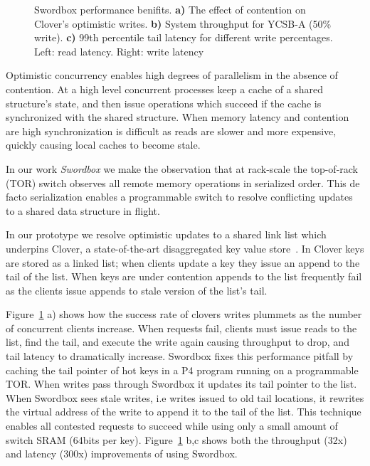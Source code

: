 \begin{figure}[t!]
    \caption{Swordbox performance benifits. \textbf{a)} The effect of contention on
    Clover's optimistic writes. \textbf{b)} System throughput
    for YCSB-A (50\% write). \textbf{c)} 99th percentile tail
    latency for different write percentages. Left: read
    latency. Right: write latency}
        
    \label{fig:swordbox}
\end{figure}

Optimistic concurrency enables high degrees of parallelism
in the absence of contention. At a high level concurrent
processes keep a cache of a shared structure's state, and
then issue operations which succeed if the cache is
synchronized with the shared structure. When memory latency
and contention are high synchronization is difficult as
reads are slower and more expensive, quickly causing local
caches to become stale.

In our work \textit{Swordbox} we make the observation that
at rack-scale the top-of-rack (TOR) switch observes all
remote memory operations in serialized order. This de facto
serialization enables a programmable switch to resolve
conflicting updates to a shared data structure in flight.

In our prototype we resolve optimistic updates to a shared
link list which underpins Clover, a state-of-the-art
disaggregated key value store~\cite{clover}. In Clover keys
are stored as a linked list; when clients update a key they
issue an append to the tail of the list. When keys are under
contention appends to the list frequently fail as the
clients issue appends to stale version of the list's tail.

Figure~\ref{fig:swordbox} a) shows how the success rate of
clovers writes plummets as the number of concurrent clients
increase. When requests fail, clients must issue reads to
the list, find the tail, and execute the write again causing
throughput to drop, and tail latency to dramatically
increase. Swordbox fixes this performance pitfall by caching
the tail pointer of hot keys in a P4 program running on a
programmable TOR. When writes pass through Swordbox it
updates its tail pointer to the list.  When Swordbox sees
stale writes, i.e writes issued to old tail locations, it
rewrites the virtual address of the write to append it to
the tail of the list. This technique enables all contested
requests to succeed while using only a small amount of
switch SRAM (64bits per key). Figure~\ref{fig:swordbox} b,c
shows both the throughput (32x) and latency (300x)
improvements of using Swordbox.

